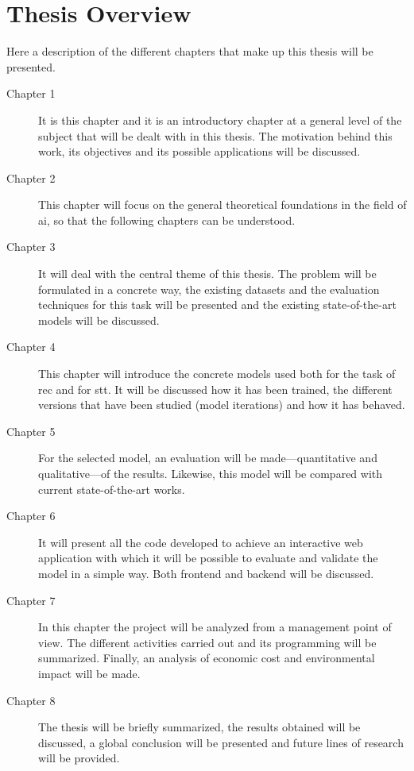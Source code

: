 \section{Thesis Overview}

Here a description of the different chapters that make up this thesis will be
presented.

\begin{description}
  \item [Chapter 1] It is this chapter and it is an introductory chapter at a
  general level of the subject that will be dealt with in this thesis. The
  motivation behind this work, its objectives and its possible applications
  will be discussed. 
  \item [Chapter 2] This chapter will focus on the general theoretical
  foundations in the field of \gls{ai}, so that the following chapters can be
  understood. 
  \item [Chapter 3] It will deal with the central theme of this thesis. The
  problem will be formulated in a concrete way, the existing datasets and the
  evaluation techniques for this task will be presented and the existing
  state-of-the-art models will be discussed. 
  \item [Chapter 4] This chapter will introduce the concrete models used both
  for the task of \gls{rec} and for \gls{stt}. It will be discussed how it has
  been trained, the different versions that have been studied (model
  iterations) and how it has behaved. 
  \item [Chapter 5] For the selected model, an evaluation will be
  made---quantitative and qualitative---of the results. Likewise, this model
  will be compared with current state-of-the-art works. 
  \item [Chapter 6] It will present all the code developed to achieve an
  interactive web application with which it will be possible to evaluate and
  validate the model in a simple way. Both frontend and backend will be
  discussed. 
  \item [Chapter 7] In this chapter the project will be analyzed from a
  management point of view. The different activities carried out and its
  programming will be summarized. Finally, an analysis of economic cost and
  environmental impact will be made. 
  \item [Chapter 8] The thesis will be briefly summarized, the results obtained
  will be discussed, a global conclusion will be presented and future lines of
  research will be provided. 
\end{description}

